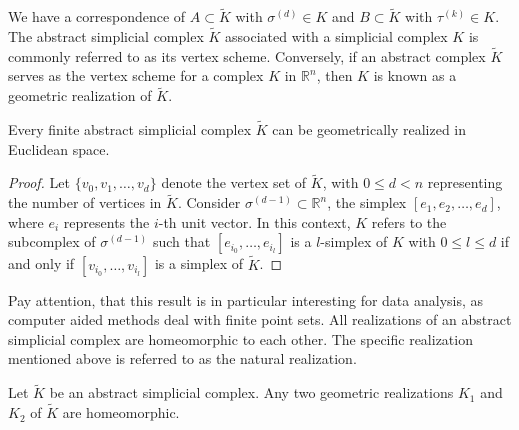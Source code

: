 We have a correspondence of $A \subset \tilde{K}$ with $\sigma^{(d)} \in K$ and $B \subset \tilde{K}$ with $\tau^{(k)} \in K$. The abstract simplicial complex $\tilde{K}$ associated with a simplicial complex
$K$ is commonly referred to as its vertex scheme.
Conversely, if an abstract complex $\tilde{K}$ serves as the vertex scheme for a
complex $K$ in $\mathbb{R}^{n}$, then $K$ is known as a geometric realization of $\tilde{K}$.

\begin{proposition}
	Every finite abstract simplicial complex $\tilde{K}$ can be geometrically realized
	in Euclidean space.
\end{proposition}

\begin{proof}
	Let $\{v_{0}, v_{1}, \ldots, v_{d}\}$ denote the vertex set of $\tilde{K}$,
	with $0 \leq d < n$ representing the number of vertices in $\tilde{K}$. Consider $\sigma^{(d-1)}
	\subset \mathbb{R}^{n}$, the simplex
	$[e_{1}, e_{2}, \ldots, e_{d}]$, where $e_{i}$ represents the $i$-th unit vector.
	In this context, $K$ refers to the subcomplex of $\sigma^{(d-1)}$ such that $[e
		_{i_0}, \ldots, e_{i_l}]$ is a $l$-simplex of $K$ with $0 \leq l \leq d$ if and only if $[v_{i_0}, \ldots
	, v_{i_l}]$ is a simplex of $\tilde{K}$.
\end{proof}

Pay attention, that this result is in particular interesting for data analysis, as computer aided methods deal with finite point sets. All realizations of an abstract simplicial complex are homeomorphic to each other.
The specific realization mentioned above is referred to as the natural
realization.

\begin{proposition}
Let $\tilde{K}$ be an abstract simplicial complex. Any two geometric realizations $K_1$ and $K_2$ of $\tilde{K}$ are homeomorphic.
\end{proposition}

